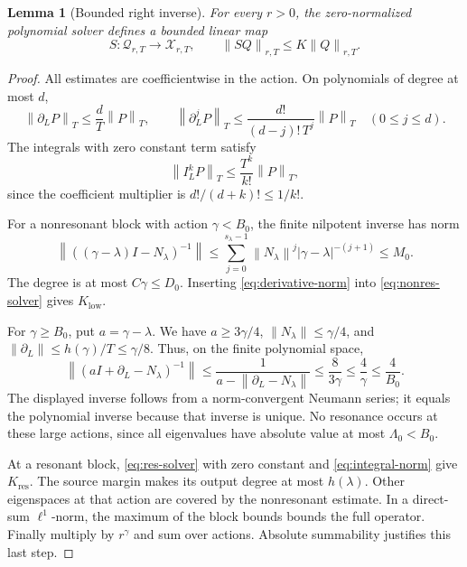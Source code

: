 \documentclass[11pt,a4paper]{article}
\numberwithin{equation}{section}
\newtheorem{lemma}[theorem]{Lemma}
\theoremstyle{definition}
\theoremstyle{remark}
\newcommand{\dd}{\partial_L}
\newcommand{\norm}[1]{\left\lVert #1\right\rVert}
\begin{document}
\begin{lemma}[Bounded right inverse]\label{lem:bounded}
For every \(r>0\), the zero-normalized polynomial solver defines a
bounded linear map
\[
 S:\mathcal Q_{r,T}\longrightarrow\mathcal X_{r,T},
 \qquad \norm{SQ}_{r,T}\le K\norm{Q}_{r,T}.
\]
\end{lemma}
\begin{proof}
All estimates are coefficientwise in the action. On polynomials of
degree at most \(d\),
\begin{equation}\label{eq:derivative-norm}
 \norm{\dd P}_T\le\frac dT\norm{P}_T,
 \qquad
 \norm{\dd^jP}_T\le
     \frac{d!}{(d-j)!\,T^j}\norm{P}_T
       \quad(0\le j\le d).
\end{equation}
The integrals with zero constant term satisfy
\begin{equation}\label{eq:integral-norm}
 \norm{I_L^kP}_T\le\frac{T^k}{k!}\norm{P}_T,
\end{equation}
since the coefficient multiplier is
\(d!/(d+k)!\le1/k!\).

For a nonresonant block with action \(\gamma<B_0\), the finite
nilpotent inverse has norm
\[
 \norm{((\gamma-\lambda)I-N_\lambda)^{-1}}
 \le\sum_{j=0}^{s_\lambda-1}
        \norm{N_\lambda}^{j}|\gamma-\lambda|^{-(j+1)}
 \le M_0.
\]
The degree is at most \(C\gamma\le D_0\). Inserting
\eqref{eq:derivative-norm} into \eqref{eq:nonres-solver} gives
\(K_{\mathrm{low}}\).

For \(\gamma\ge B_0\), put \(a=\gamma-\lambda\). We have
\(a\ge3\gamma/4\), \(\norm{N_\lambda}\le\gamma/4\), and
\(\norm{\dd}\le h(\gamma)/T\le\gamma/8\). Thus, on the finite
polynomial space,
\[
 \norm{(aI+\dd-N_\lambda)^{-1}}
 \le\frac{1}{a-\norm{\dd-N_\lambda}}
 \le\frac{8}{3\gamma}\le\frac4\gamma\le\frac4{B_0}.
\]
The displayed inverse follows from a norm-convergent Neumann series;
it equals the polynomial inverse because that inverse is unique.
No resonance occurs at these large actions, since all eigenvalues have
absolute value at most \(\Lambda_0<B_0\).

At a resonant block, \eqref{eq:res-solver} with zero constant and
\eqref{eq:integral-norm} give \(K_{\mathrm{res}}\). The source
margin makes its output degree at most \(h(\lambda)\).
Other eigenspaces at that action are covered by the nonresonant
estimate. In a direct-sum \(\ell^1\)-norm, the maximum of the block
bounds bounds the full operator. Finally multiply by \(r^\gamma\)
and sum over actions. Absolute summability justifies this last step.
\end{proof}
\end{document}
